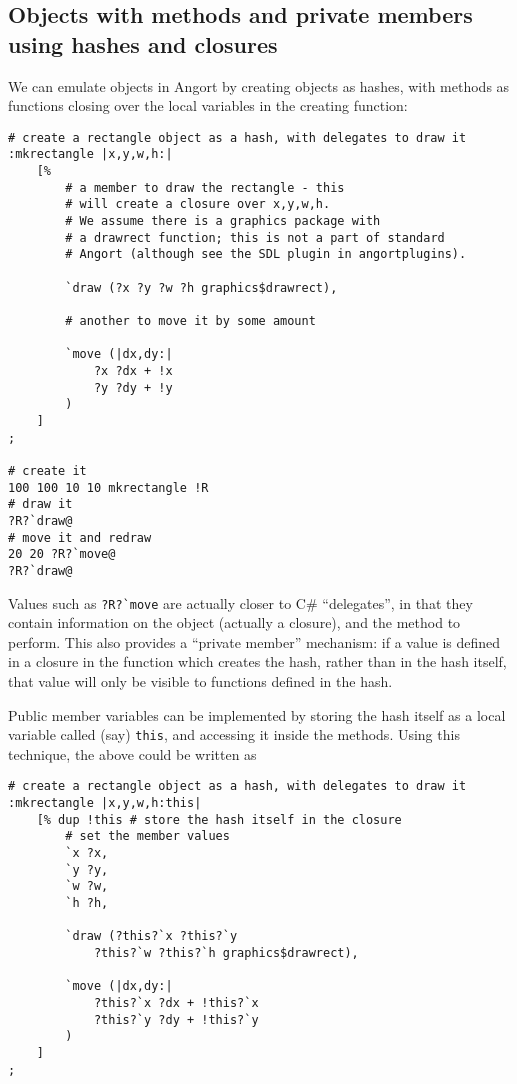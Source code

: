 \subsection{Objects with methods and private members using hashes and closures}
We can emulate objects in Angort by creating objects as
hashes, with methods as functions closing over the local variables
in the creating function:

\begin{lstlisting}
# create a rectangle object as a hash, with delegates to draw it
:mkrectangle |x,y,w,h:|
    [%
        # a member to draw the rectangle - this
        # will create a closure over x,y,w,h.
        # We assume there is a graphics package with
        # a drawrect function; this is not a part of standard
        # Angort (although see the SDL plugin in angortplugins).
        
        `draw (?x ?y ?w ?h graphics$drawrect),
        
        # another to move it by some amount
        
        `move (|dx,dy:| 
            ?x ?dx + !x
            ?y ?dy + !y
        )
    ]
;   

# create it
100 100 10 10 mkrectangle !R
# draw it
?R?`draw@
# move it and redraw
20 20 ?R?`move@
?R?`draw@
\end{lstlisting}
Values such as \verb+?R?`move+ are actually closer to C\# ``delegates'', in that they 
contain information on the object (actually a closure), and the method to perform.
This also provides a ``private member'' mechanism: if a value is defined
in a closure in the function which creates the hash, rather than in
the hash itself, that value will only be visible to functions defined
in the hash.

Public member variables can be implemented by storing the hash
itself as a local variable called (say) \texttt{this}, and accessing it inside
the methods. Using this technique, the above could be written as 
\begin{lstlisting}
# create a rectangle object as a hash, with delegates to draw it
:mkrectangle |x,y,w,h:this|
    [% dup !this # store the hash itself in the closure
        # set the member values
        `x ?x,
        `y ?y,
        `w ?w,
        `h ?h,
        
        `draw (?this?`x ?this?`y 
            ?this?`w ?this?`h graphics$drawrect),
        
        `move (|dx,dy:| 
            ?this?`x ?dx + !this?`x
            ?this?`y ?dy + !this?`y
        )
    ]
;   
\end{lstlisting}



